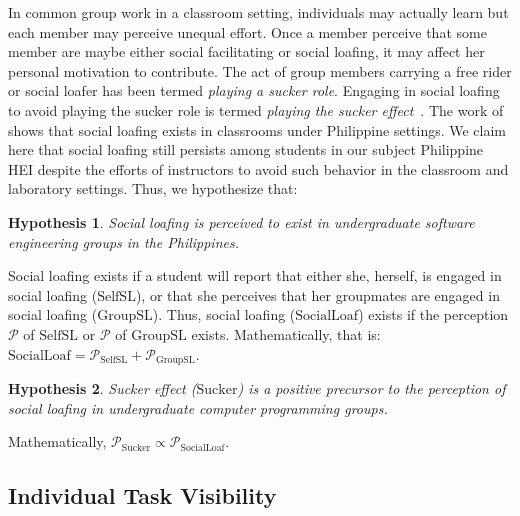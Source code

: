 \documentclass[a4paper,a4paper,BCOR12mm,12pt,abstracton,pointednumbers,tablecaptionabove,footinclude,halfparskip,normalheadings,]{scrartcl}
\newcommand{\PERCEPT}{\mathcal{P}}
\newcommand{\SOCLOAF}{\mathrm{SocialLoaf}}
\newcommand{\SELFSL}{\mathrm{SelfSL}}
\newcommand{\GROUPSL}{\mathrm{GroupSL}}
\newcommand{\SUCKER}{\mathrm{Sucker}}
\newtheorem{hypothesis}{Hypothesis}
\begin{document}
In common group work in a classroom setting, individuals may actually learn but each member may perceive unequal effort. Once a member perceive that some member are maybe either social facilitating  or social loafing, it may affect her personal motivation to contribute. The act of group members carrying a free rider or social loafer has been termed {\em playing a sucker role}. Engaging in social loafing to avoid playing the sucker role is termed {\em playing the sucker effect}~\citep{Kerr83}. The work of~\citet{Pabico08} shows that social loafing exists in classrooms under Philippine settings. We claim here that social loafing still persists among students in our subject Philippine HEI despite the efforts of instructors to avoid such behavior in the classroom and laboratory settings. Thus, we hypothesize that:

\begin{hypothesis}
Social loafing is perceived to exist in undergraduate software engineering groups in the Philippines.\label{hyp:socloaf}
\end{hypothesis}

Social loafing exists if a student will report that either she, herself, is engaged in social loafing ($\SELFSL$), or that she perceives that her groupmates are engaged in social loafing ($\GROUPSL$). Thus, social loafing ($\SOCLOAF$) exists if the perception $\PERCEPT$ of $\SELFSL$ or $\PERCEPT$ of $\GROUPSL$ exists. Mathematically, that is: $\SOCLOAF = \PERCEPT_\SELFSL + \PERCEPT_\GROUPSL$.

\begin{hypothesis}
Sucker effect ($\SUCKER$) is a positive precursor to the perception of social loafing in undergraduate computer programming groups.\label{hyp:sucker}
\end{hypothesis}

Mathematically, $\PERCEPT_\SUCKER \propto \PERCEPT_\SOCLOAF$.

\subsection{Individual Task Visibility}
\end{document}
